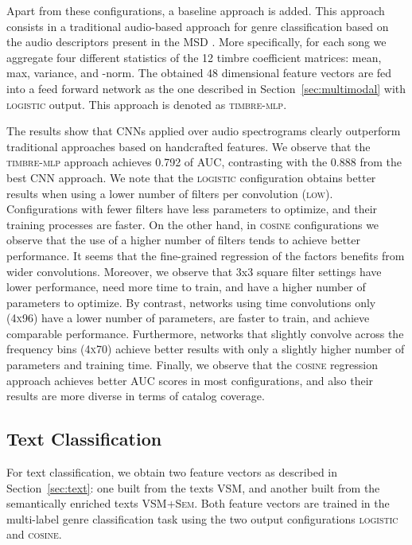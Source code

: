 \documentclass{article}
\begin{document}
Apart from these configurations, a baseline approach is added. This approach consists in a traditional audio-based approach for genre classification based on the audio descriptors present in the MSD \cite{Bertin-Mahieux2011}.
More specifically, for each song we aggregate four different statistics of the 12 timbre coefficient matrices: mean, max, variance, and -norm.
The obtained 48 dimensional feature vectors are fed into a feed forward network as the one described in Section~\ref{sec:multimodal} with \textsc{logistic} output.
This approach is denoted as \textsc{timbre-mlp}.




The results show that CNNs applied over audio spectrograms clearly outperform traditional approaches based on handcrafted features. 
We observe that the \textsc{timbre-mlp} approach achieves 0.792 of AUC, contrasting with the 0.888 from the best CNN approach.
We note that the \textsc{logistic} configuration obtains better results when using a lower number of filters per convolution (\textsc{low}). Configurations with fewer filters have less parameters to optimize, and their training processes are faster. 
On the other hand, in \textsc{cosine} configurations we observe that the use of a higher number of filters tends to achieve better performance. 
It seems that the fine-grained regression of the factors benefits from wider convolutions.
Moreover, we observe that 3x3 square filter settings have lower performance, need more time to train, and have a higher number of parameters to optimize.
By contrast, networks using time convolutions only (\textsc{4x96}) have a lower number of parameters, are faster to train, and achieve comparable performance. 
Furthermore, networks that slightly convolve across the frequency bins (\textsc{4x70}) achieve better results with only a slightly higher number of parameters and training time. 
Finally, we observe that the \textsc{cosine} regression approach achieves better AUC scores in most configurations, and also their results are more diverse in terms of catalog coverage.





\subsection{Text Classification}\label{sec:textexp}

For text classification, we obtain two feature vectors as described in Section~\ref{sec:text}: one built from the texts \textsc{VSM}, and another built from the semantically enriched texts \textsc{VSM+Sem}. 
Both feature vectors are trained in the multi-label genre classification task using the two output configurations \textsc{logistic} and \textsc{cosine}.
\end{document}
